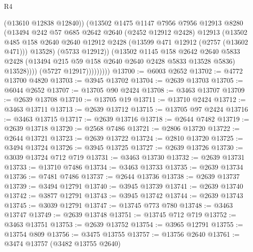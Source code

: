 \begin{lexlean}{R4}
\begin{coremodule}
                          (@13610 @12838 @12840))
                        (@13502
                          @1475
                          @1147
                          @7956
                          @7956
                          @12913
                          @8280
                          (@13494
                            @242
                            @57
                            @685
                            @2642
                            @2640
                            (@2452 @12912 @2428)
                            @12913
                            (@13502
                              @485
                              @158
                              @2640
                              @2640
                              @12912
                              @2428
                              (@13599 @471 @12912 (@2757 (@13602 @471)))
                              @13528)
                            (@5733 @12912))
                          (@13502
                            @1145
                            @158
                            @2642
                            @2640
                            @5833
                            @2428
                            (@13494 @215 @59 @158 @2640 @2640 @2428 @5833 @13528 @5836)
                            @13528))))
                    (@5727 @12917)))))))))
@13700 := @6003 @2652
@13702 := @4772 @13700 @4820
@13703 := @3945 @13702
@13704 := @2639 @13703
@13705 := @6044 @2652
@13707 := @13705 @90 @2424
@13708 := @3463 @13707
@13709 := @2639 @13708
@13710 := @13705 @19
@13711 := @13710 @2424
@13712 := @3463 @13711
@13713 := @2639 @13712
@13715 := @13705 @97 @2424
@13716 := @3463 @13715
@13717 := @2639 @13716
@13718 := @2644 @7482
@13719 := @2639 @13718
@13720 := @2568 @7486
@13721 := @2806 @13720
@13722 := @2644 @13721
@13723 := @2639 @13722
@13724 := @2810 @13720
@13725 := @3494 @13724
@13726 := @3945 @13725
@13727 := @2639 @13726
@13730 := @3039 @13724 @712 @719
@13731 := @3463 @13730
@13732 := @2639 @13731
@13733 := @13710 @7486
@13734 := @3463 @13733
@13735 := @2639 @13734
@13736 := @7481 @7486
@13737 := @2644 @13736
@13738 := @2639 @13737
@13739 := @3494 @12791
@13740 := @3945 @13739
@13741 := @2639 @13740
@13742 := @3877 @12791
@13743 := @3945 @13742
@13744 := @2639 @13743
@13745 := @3039 @12791
@13747 := @13745 @773 @780
@13748 := @3463 @13747
@13749 := @2639 @13748
@13751 := @13745 @712 @719
@13752 := @3463 @13751
@13753 := @2639 @13752
@13754 := @3965 @12791
@13755 := @13754 @809
@13756 := @3475 @13755
@13757 := @13756 @2640
@13761 := @3474 @13757 (@3482 @13755 @2640)

\end{coremodule}
\end{lexlean}
